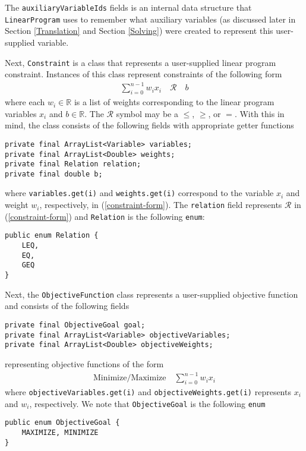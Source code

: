 \documentclass{article}
\newcommand{\javaCode}[1]{\texttt{#1}}
\begin{document}
The \javaCode{auxiliaryVariableIds} fields is an internal data structure that \javaCode{LinearProgram} uses to remember what auxiliary variables (as discussed later in Section \ref{Translation} and Section \ref{Solving}) were created to represent this user-supplied variable.


Next, \javaCode{Constraint} is a class that represents a user-supplied linear program constraint. Instances of this class represent constraints of the following form
\begin{align} \label{constraint-form}
    \sum_{i=0}^{n-1} w_i x_i \quad \mathcal{R} \quad b
\end{align}
where each $w_i \in \mathbb{R}$ is a list of weights corresponding to the linear program variables $x_i$ and $b \in \mathbb{R}$. The $\mathcal{R}$ symbol may be a $\leq$, $\geq$, or $=$. With this in mind, the class consists of the following fields with appropriate getter functions
\begin{verbatim}
private final ArrayList<Variable> variables;
private final ArrayList<Double> weights;
private final Relation relation;
private final double b;
\end{verbatim}
where \javaCode{variables.get(i)} and \javaCode{weights.get(i)} correspond to the variable $x_i$ and weight $w_i$, respectively, in (\ref{constraint-form}). The \javaCode{relation} field represents $\mathcal{R}$ in (\ref{constraint-form}) and \javaCode{Relation} is the following \javaCode{enum}:
\begin{verbatim}
public enum Relation {
    LEQ,
    EQ,
    GEQ
}
\end{verbatim}


Next, the \javaCode{ObjectiveFunction} class represents a user-supplied objective function and consists of the following fields
\begin{verbatim}
private final ObjectiveGoal goal;
private final ArrayList<Variable> objectiveVariables;
private final ArrayList<Double> objectiveWeights;
\end{verbatim}
representing objective functions of the form
\begin{align*}
    \text{Minimize/Maximize} \quad \sum_{i=0}^{n-1} w_i x_i
\end{align*}
where \javaCode{objectiveVariables.get(i)} and \javaCode{objectiveWeights.get(i)} represents $x_i$ and $w_i$, respectively. We note that \javaCode{ObjectiveGoal} is the following \javaCode{enum}
\begin{verbatim}
public enum ObjectiveGoal {
    MAXIMIZE, MINIMIZE
}
\end{verbatim}
\end{document}
